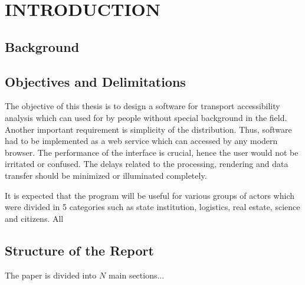 \section{ INTRODUCTION }

\subsection{ Background }

\subsection{ Objectives and Delimitations }
The objective of this thesis is to design a software for transport accessibility analysis
which can used for by people without special background in the field. Another important
requirement is simplicity of the distribution. Thus, software had to be implemented
as a web service which can accessed by any modern browser. The performance of the interface
is crucial, hence the user would not be irritated or confused. The delays related to the processing,
rendering and data transfer should be minimized or illuminated completely.

It is expected that the program will be useful for various groups of actors which
were divided in 5 categories such as state institution, logistics, real estate, science
and citizens. All

\subsection{ Structure of the Report }
The paper is divided into $N$ main sections...
